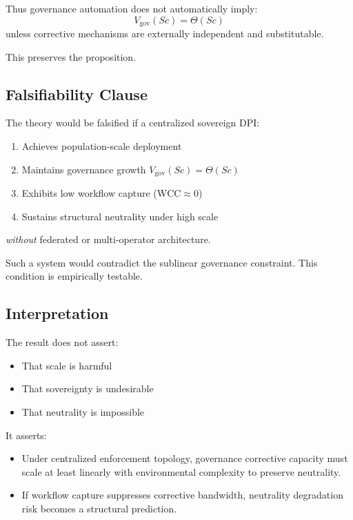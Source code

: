 \documentclass{article}
\begin{document}
Thus governance automation does not automatically imply:
\begin{equation}
V_{\text{gov}}(Sc) = \Theta(Sc)
\end{equation}
unless corrective mechanisms are externally independent and substitutable.

This preserves the proposition.

\subsection{Falsifiability Clause}

The theory would be falsified if a centralized sovereign DPI:
\begin{enumerate}[noitemsep]
    \item Achieves population-scale deployment
    \item Maintains governance growth $V_{\text{gov}}(Sc) = \Theta(Sc)$
    \item Exhibits low workflow capture ($\text{WCC} \approx 0$)
    \item Sustains structural neutrality under high scale
\end{enumerate}
\textit{without} federated or multi-operator architecture.

Such a system would contradict the sublinear governance constraint. This condition is empirically testable.

\subsection{Interpretation}

The result does not assert:
\begin{itemize}[noitemsep]
    \item That scale is harmful
    \item That sovereignty is undesirable
    \item That neutrality is impossible
\end{itemize}

It asserts:
\begin{itemize}[noitemsep]
    \item Under centralized enforcement topology, governance corrective capacity must scale at least linearly with environmental complexity to preserve neutrality.
    \item If workflow capture suppresses corrective bandwidth, neutrality degradation risk becomes a structural prediction.
\end{itemize}
\end{document}
